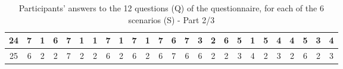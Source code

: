 \begin{sidewaystable}[]
\begin{tabular}{|c|c|c|c|c|c|c|c|c|c|c|c|c|c|c|c|c|c|c|c|c|c|c|c|c|}
    24      & 7                                               & 1                                               & 6                                               & 7                                               & 1                                               & 1                                               & 7                                               & 1                                               & 7                                               & 1                                                & 7                                                & 6                                                & 7                                               & 3                                               & 2                                               & 6                                               & 5                                               & 1                                               & 5                                               & 4                                               & 4                                               & 5                                                & 3                                                & 4                                                \\ \hline
    25      & 6                                               & 2                                               & 2                                               & 7                                               & 2                                               & 2                                               & 6                                               & 2                                               & 6                                               & 2                                                & 6                                                & 7                                                & 6                                               & 6                                               & 2                                               & 2                                               & 3                                               & 4                                               & 2                                               & 3                                               & 2                                               & 6                                                & 2                                                & 3                                                \\ \hline
    \end{tabular}
    \caption{Participants' answers to the 12 questions (Q) of the questionnaire, for each of the 6 scenarios (S) - Part 2/3}
    \label{tab:ap:answers_2}
\end{sidewaystable}

